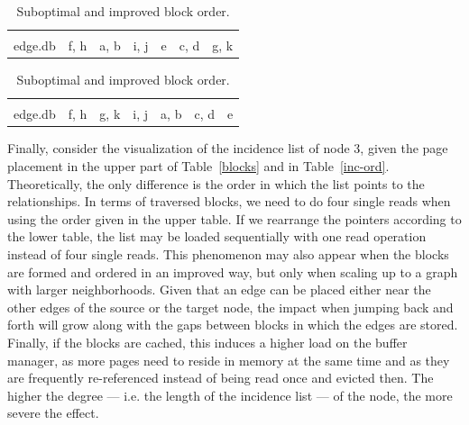      \begin{table}[htp]
          \centering
    \begin{tabular}{|l | c | c | c | c | c | c|} \hline
    &&&&&&\\[-1em]
     edge.db &  \colorbox{green!30}{f}, \colorbox{green!30}{h}   & \colorbox{blue!30}{a}, \colorbox{blue!30}{b} & \colorbox{green!30}{i}, \colorbox{green!30}{j} & \colorbox{red!30}{e} & \colorbox{blue!30}{c}, \colorbox{blue!30}{d} & \colorbox{green!30}{g}, \colorbox{green!30}{k} \\ \hline
    \end{tabular}
    \vspace{0.5cm}
    
    \begin{tabular}{|l | c | c | c | c | c | c|}\hline
    &&&&&&\\[-1em]
     edge.db &  \colorbox{green!30}{f}, \colorbox{green!30}{h} & \colorbox{green!30}{g}, \colorbox{green!30}{k} & \colorbox{green!30}{i}, \colorbox{green!30}{j} & \colorbox{blue!30}{a}, \colorbox{blue!30}{b} & \colorbox{blue!30}{c}, \colorbox{blue!30}{d} & \colorbox{red!30}{e} \\ \hline
    \end{tabular}
      \caption{Suboptimal and improved block order.}
    \label{order}
       \end{table}
  
  Finally, consider the visualization of the incidence list of node 3, given the page placement in the upper part of Table~\ref{blocks} and in Table~\ref{inc-ord}. 
  Theoretically, the only difference is the order in which the list points to the relationships. 
  In terms of traversed blocks, we need to do four single reads when using the order given in the upper table. 
  If we rearrange the pointers according to the lower table, the list may be loaded sequentially with one read operation instead of four single reads. 
  This phenomenon may also appear when the blocks are formed and ordered in an improved way, but only when scaling up to a graph with larger neighborhoods.
  Given that an edge can be placed either near the other edges of the source or the target node, the impact when jumping back and forth will grow along with the gaps between blocks in which the edges are stored.
  Finally, if the blocks are cached, this induces a higher load on the buffer manager, as more pages need to reside in memory at the same time and as they are frequently re-referenced instead of being read once and evicted then.
  The higher the degree --- i.e. the length of the incidence list --- of the node, the more severe the effect.

